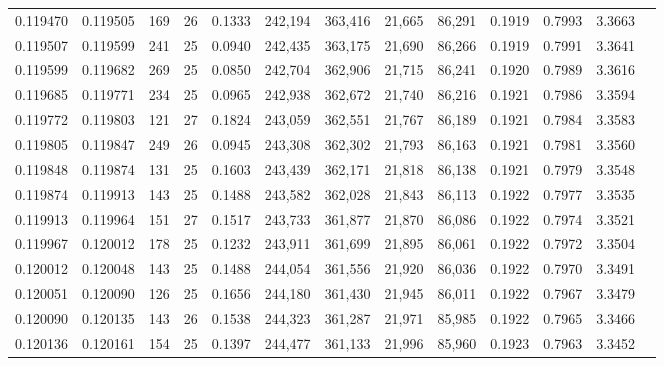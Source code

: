 \begin{tabular}{rrrrrrrrrrrrr}
0.119470 & 0.119505 & 169 &  26 &                                     0.1333 & 242,194 & 363,416 &  21,665 &  86,291 & 0.1919 & 0.7993 & 3.3663 \\
0.119507 & 0.119599 & 241 &  25 &                                     0.0940 & 242,435 & 363,175 &  21,690 &  86,266 & 0.1919 & 0.7991 & 3.3641 \\
0.119599 & 0.119682 & 269 &  25 &                                     0.0850 & 242,704 & 362,906 &  21,715 &  86,241 & 0.1920 & 0.7989 & 3.3616 \\
0.119685 & 0.119771 & 234 &  25 &                                     0.0965 & 242,938 & 362,672 &  21,740 &  86,216 & 0.1921 & 0.7986 & 3.3594 \\
0.119772 & 0.119803 & 121 &  27 &                                     0.1824 & 243,059 & 362,551 &  21,767 &  86,189 & 0.1921 & 0.7984 & 3.3583 \\
0.119805 & 0.119847 & 249 &  26 &                                     0.0945 & 243,308 & 362,302 &  21,793 &  86,163 & 0.1921 & 0.7981 & 3.3560 \\
0.119848 & 0.119874 & 131 &  25 &                                     0.1603 & 243,439 & 362,171 &  21,818 &  86,138 & 0.1921 & 0.7979 & 3.3548 \\
0.119874 & 0.119913 & 143 &  25 &                                     0.1488 & 243,582 & 362,028 &  21,843 &  86,113 & 0.1922 & 0.7977 & 3.3535 \\
0.119913 & 0.119964 & 151 &  27 &                                     0.1517 & 243,733 & 361,877 &  21,870 &  86,086 & 0.1922 & 0.7974 & 3.3521 \\
0.119967 & 0.120012 & 178 &  25 &                                     0.1232 & 243,911 & 361,699 &  21,895 &  86,061 & 0.1922 & 0.7972 & 3.3504 \\
0.120012 & 0.120048 & 143 &  25 &                                     0.1488 & 244,054 & 361,556 &  21,920 &  86,036 & 0.1922 & 0.7970 & 3.3491 \\
0.120051 & 0.120090 & 126 &  25 &                                     0.1656 & 244,180 & 361,430 &  21,945 &  86,011 & 0.1922 & 0.7967 & 3.3479 \\
0.120090 & 0.120135 & 143 &  26 &                                     0.1538 & 244,323 & 361,287 &  21,971 &  85,985 & 0.1922 & 0.7965 & 3.3466 \\
0.120136 & 0.120161 & 154 &  25 &                                     0.1397 & 244,477 & 361,133 &  21,996 &  85,960 & 0.1923 & 0.7963 & 3.3452 \\

\end{tabular}
